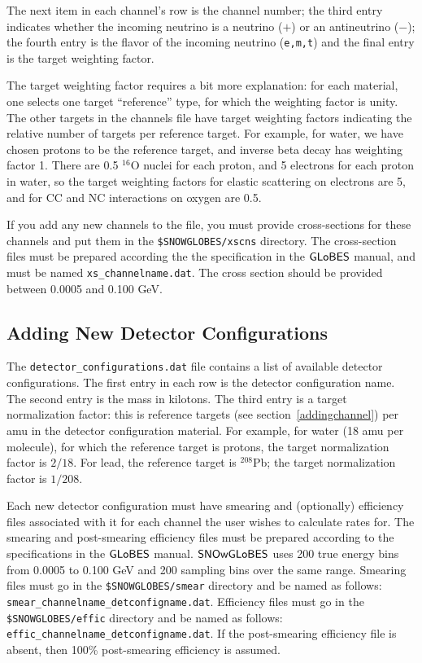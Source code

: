 \documentclass[12pt]{article}
\newcommand{\globes}{\sf{GLoBES}}
\newcommand{\snowglobes}{\sf{SNOwGLoBES}}
\begin{document}
The next item in each channel's row is the channel number; the third
entry indicates whether the incoming neutrino is a neutrino ($+$) or
an antineutrino ($-$); the fourth entry is the flavor of the incoming
neutrino (\texttt{e,m,t}) and the final entry is the target weighting
factor.

The target weighting factor requires a bit more explanation: for each
material, one selects one target ``reference'' type, for which the
weighting factor is unity.  The other targets in the channels file
have target weighting factors indicating the relative number of
targets per reference target.  For example, for water, we have chosen
protons to be the reference target, and inverse beta decay has
weighting factor 1. There are 0.5 $^{16}$O nuclei for each proton, and
5 electrons for each proton in water, so the target weighting factors
for elastic scattering on electrons are 5, and for CC and NC interactions on
oxygen are 0.5.

If you add any new channels to the file, you must provide
cross-sections for these channels and put them in the
\texttt{\$SNOWGLOBES/xscns} directory.  The cross-section files must
be prepared according the the specification in the $\globes$ manual,
and must be named \texttt{xs\_channelname.dat}.  The cross section should be provided between 0.0005 and 0.100 GeV.

\subsection{Adding New Detector Configurations}

The \texttt{detector\_configurations.dat} file contains a list of
available detector configurations.  The first entry in each row is the
detector configuration name.  The second entry is the mass in
kilotons.  The third entry is a target normalization factor: this is
reference targets (see section~\ref{addingchannel}) per
amu in the detector configuration material.  For example,
for water (18 amu per molecule), for which the reference target is protons, the target
normalization factor is $2/18$.  For lead, the reference target is
$^{208}$Pb; the target normalization factor is $1/208$.

Each new detector configuration must have smearing and
(optionally) efficiency files associated with it for each channel the
user wishes to calculate rates for.  The smearing and post-smearing
efficiency files must be prepared according to the specifications in
the $\globes$ manual.  $\snowglobes$ uses 200 true energy bins from 0.0005 to 0.100 GeV and 200 sampling bins over the same range.
Smearing files must go in the
\texttt{\$SNOWGLOBES/smear} directory and be named as follows:
\texttt{smear\_channelname\_detconfigname.dat}.  Efficiency files must
go in the \texttt{\$SNOWGLOBES/effic} directory and be named as
follows: \texttt{effic\_channelname\_detconfigname.dat}.
If the post-smearing efficiency file is absent, then 100\% post-smearing efficiency is assumed.
\end{document}
